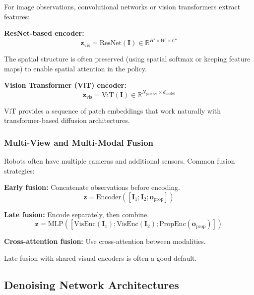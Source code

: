For image observations, convolutional networks or vision transformers extract features:

\textbf{ResNet-based encoder:}
\begin{equation}
\mathbf{z}_{\text{vis}} = \text{ResNet}(\mathbf{I}) \in \mathbb{R}^{H' \times W' \times C'}
\label{eq:resnet_encoder}
\end{equation}

The spatial structure is often preserved (using spatial softmax or keeping feature maps) to enable spatial attention in the policy.

\textbf{Vision Transformer (ViT) encoder:}
\begin{equation}
\mathbf{z}_{\text{vis}} = \text{ViT}(\mathbf{I}) \in \mathbb{R}^{N_{\text{patches}} \times d_{\text{model}}}
\label{eq:vit_encoder}
\end{equation}

ViT provides a sequence of patch embeddings that work naturally with transformer-based diffusion architectures.

\subsubsection{Multi-View and Multi-Modal Fusion}

Robots often have multiple cameras and additional sensors. Common fusion strategies:

\textbf{Early fusion:} Concatenate observations before encoding.
\begin{equation}
\mathbf{z} = \text{Encoder}([\mathbf{I}_1; \mathbf{I}_2; \mathbf{o}_{\text{prop}}])
\label{eq:early_fusion}
\end{equation}

\textbf{Late fusion:} Encode separately, then combine.
\begin{equation}
\mathbf{z} = \text{MLP}([\text{VisEnc}(\mathbf{I}_1); \text{VisEnc}(\mathbf{I}_2); \text{PropEnc}(\mathbf{o}_{\text{prop}})])
\label{eq:late_fusion}
\end{equation}

\textbf{Cross-attention fusion:} Use cross-attention between modalities.

Late fusion with shared visual encoders is often a good default.

\subsection{Denoising Network Architectures}
\label{subsec:denoising_architectures}

